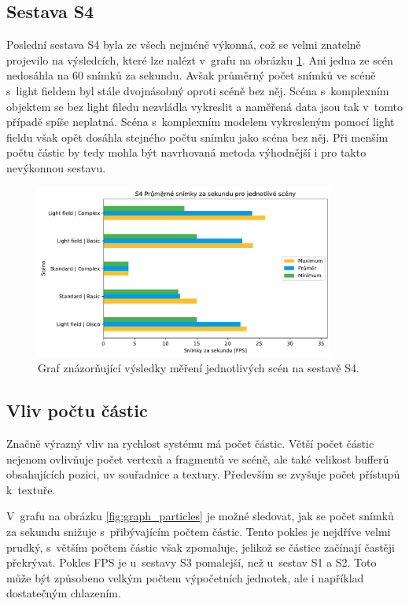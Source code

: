 \subsection*{Sestava S4}
Poslední sestava S4 byla ze všech nejméně výkonná, což se velmi znatelně projevilo na výsledcích, které lze nalézt v~grafu na obrázku \ref{fig:graphS4Basic}. Ani jedna ze scén nedosáhla na 60 snímků za sekundu. Avšak průměrný počet snímků ve scéně s~light fieldem byl stále dvojnásobný oproti scéně bez něj. Scéna s~komplexním objektem se bez light filedu nezvládla vykreslit a naměřená data jsou tak v~tomto případě spíše neplatná. Scéna s~komplexním modelem vykresleným pomocí light fieldu však opět dosáhla stejného počtu snímku jako scéna bez něj. Při menším počtu částic by tedy mohla být navrhovaná metoda výhodnější i pro takto nevýkonnou sestavu.  

\begin{figure}[H]
	\centering
		\includegraphics[width=0.88\textwidth]{obrazky-figures/graphS4basic.pdf}
	\caption{Graf znázorňující výsledky měření jednotlivých scén na sestavě S4.}
	\label{fig:graphS4Basic}
\end{figure}

\subsection{Vliv počtu částic}
Značně výrazný vliv na rychlost systému má počet částic. Větší počet částic nejenom ovlivňuje počet vertexů a fragmentů ve scéně, ale také velikost bufferů obsahujících pozici, uv souřadnice a textury. Především se zvyšuje počet přístupů k~textuře. 

V~grafu na obrázku \ref{fig:graph_particles} je možné sledovat, jak se počet snímků za sekundu snižuje s~přibývajícím počtem  částic. Tento pokles je nejdříve velmi prudký, s~větším počtem částic však zpomaluje, jelikož se částice začínají častěji překrývat. Pokles FPS je u~sestavy S3 pomalejší, než u~sestav S1 a S2. Toto může být způsobeno velkým počtem výpočetních jednotek, ale i například dostatečným chlazením.

